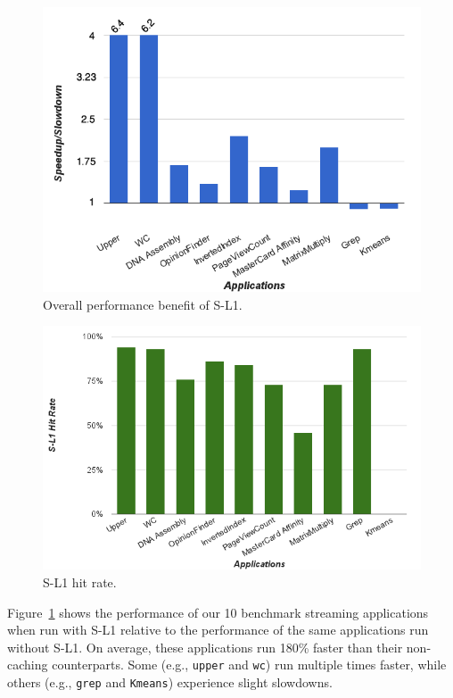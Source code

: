 \begin{figure}[t]
\includegraphics[scale=0.32]{1speedups.png}
\caption{Overall performance benefit of S-L1.}
\label{fig:perfbenefit}
\end{figure}

\begin{figure}[t]
\includegraphics[scale=0.24]{3memoryAcceessReuction.png}
\caption{S-L1 hit rate.}
\label{fig:sl1hitrate}
\end{figure}




Figure~\ref{fig:perfbenefit} shows the performance of our 10 benchmark streaming applications when run with S-L1 relative to the performance of the same applications run without S-L1.
On average, these applications run 180\% faster than their non-caching counterparts. 
Some (e.g., \texttt{upper} and \texttt{wc}) run multiple times faster, while others (e.g., \texttt{grep} and \texttt{Kmeans}) experience slight slowdowns.

